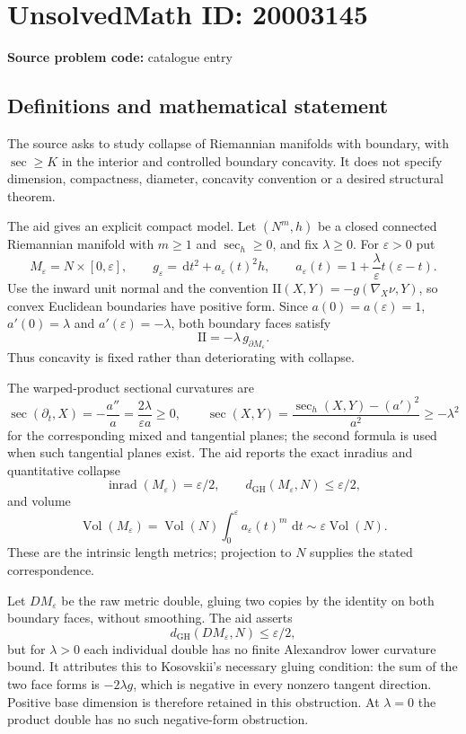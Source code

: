 \documentclass[11pt]{article}
\newcommand{\eps}{\varepsilon}
\newcommand{\dd}{\,\mathrm{d}}
\begin{document}
\section*{UnsolvedMath ID: 20003145}
\textbf{Source problem code:} catalogue entry
\subsection{Definitions and mathematical statement}
The source asks to study collapse of Riemannian manifolds with boundary, with $\sec\geq K$ in the interior and controlled boundary concavity. It does not specify dimension, compactness, diameter, concavity convention or a desired structural theorem.

The aid gives an explicit compact model. Let $(N^m,h)$ be a closed connected Riemannian manifold with $m\geq1$ and $\sec_h\geq0$, and fix $\lambda\geq0$. For $\eps>0$ put
\[
M_\eps=N\times[0,\eps],\qquad
g_\eps=\dd t^2+a_\eps(t)^2h,\qquad
a_\eps(t)=1+\frac\lambda\eps t(\eps-t).
\]
Use the inward unit normal and the convention $\mathrm{II}(X,Y)=-g(\nabla_X\nu,Y)$, so convex Euclidean boundaries have positive form. Since $a(0)=a(\eps)=1$, $a'(0)=\lambda$ and $a'(\eps)=-\lambda$, both boundary faces satisfy
\[
\mathrm{II}=-\lambda\,g_{\partial M_\eps}.
\]
Thus concavity is fixed rather than deteriorating with collapse.

The warped-product sectional curvatures are
\[
\sec(\partial_t,X)=-\frac{a''}{a}=\frac{2\lambda}{\eps a}\geq0,
\qquad
\sec(X,Y)=\frac{\sec_h(X,Y)-(a')^2}{a^2}\geq-\lambda^2
\]
for the corresponding mixed and tangential planes; the second formula is used when such tangential planes exist. The aid reports the exact inradius and quantitative collapse
\[
\operatorname{inrad}(M_\eps)=\eps/2,\qquad
d_{\mathrm{GH}}(M_\eps,N)\leq\eps/2,
\]
and volume
\[
\operatorname{Vol}(M_\eps)=\operatorname{Vol}(N)\int_0^\eps a_\eps(t)^m\,\dd t
\sim\eps\operatorname{Vol}(N).
\]
These are the intrinsic length metrics; projection to $N$ supplies the stated correspondence.

Let $D M_\eps$ be the raw metric double, gluing two copies by the identity on both boundary faces, without smoothing. The aid asserts
\[
d_{\mathrm{GH}}(D M_\eps,N)\leq\eps/2,
\]
but for $\lambda>0$ each individual double has no finite Alexandrov lower curvature bound. It attributes this to Kosovskii's necessary gluing condition: the sum of the two face forms is $-2\lambda g$, which is negative in every nonzero tangent direction. Positive base dimension is therefore retained in this obstruction. At $\lambda=0$ the product double has no such negative-form obstruction.
\end{document}
